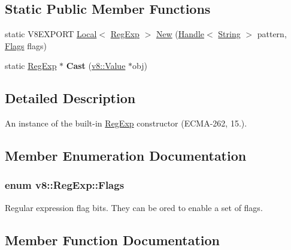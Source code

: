\subsection*{Static Public Member Functions}
\begin{DoxyCompactItemize}
\item 
static V8\+E\+X\+P\+O\+R\+T \hyperlink{classv8_1_1_local}{Local}$<$ \hyperlink{classv8_1_1_reg_exp}{Reg\+Exp} $>$ \hyperlink{classv8_1_1_reg_exp_a27390ac15b8b52057927e8c78491aacb}{New} (\hyperlink{classv8_1_1_handle}{Handle}$<$ \hyperlink{classv8_1_1_string}{String} $>$ pattern, \hyperlink{classv8_1_1_reg_exp_aa4718a5c1f18472aff3bf51ed694fc5a}{Flags} flags)
\item 
\hypertarget{classv8_1_1_reg_exp_ac06d8f61c0ebb2e7292e6aeff7108f26}{}static \hyperlink{classv8_1_1_reg_exp}{Reg\+Exp} $\ast$ {\bfseries Cast} (\hyperlink{classv8_1_1_value}{v8\+::\+Value} $\ast$obj)\label{classv8_1_1_reg_exp_ac06d8f61c0ebb2e7292e6aeff7108f26}

\end{DoxyCompactItemize}


\subsection{Detailed Description}
An instance of the built-\/in \hyperlink{classv8_1_1_reg_exp}{Reg\+Exp} constructor (E\+C\+M\+A-\/262, 15.). 

\subsection{Member Enumeration Documentation}
\hypertarget{classv8_1_1_reg_exp_aa4718a5c1f18472aff3bf51ed694fc5a}{}
\subsubsection[{Flags}]{\setlength{\rightskip}{0pt plus 5cm}enum {\bf v8\+::\+Reg\+Exp\+::\+Flags}}\label{classv8_1_1_reg_exp_aa4718a5c1f18472aff3bf51ed694fc5a}
Regular expression flag bits. They can be or\textquotesingle{}ed to enable a set of flags. 

\subsection{Member Function Documentation}
\hypertarget{classv8_1_1_reg_exp_a02c7a85155ff5d2883ffc699e36ada4c}{}

